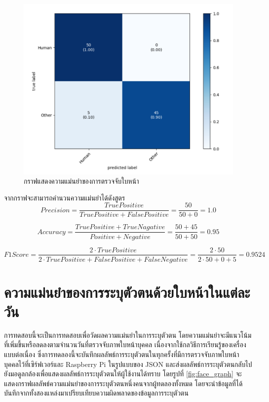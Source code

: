 \begin{figure}[!ht]
  \begin{center}
    \includegraphics[scale=.45]{pic/face_result.png}
    \caption[กราฟแสดงความแม่นยำของการตรวจจับใบหน้า]{กราฟแสดงความแม่นยำของการตรวจจับใบหน้า}
    \label{fig:acc_graph}
  \end{center}
\end{figure}
\newpage
\indent จากกราฟจะสามารถคำนวนความแม่นยำได้ดังสูตร 
\begin{equation}\label{eq:Precision}
Precision=\frac{True Positive}{True Positive + False Positive}=\frac{50}{50+0} = 1.0
\end{equation}

\begin{equation}\label{eq:Accuracy}
Accuracy=\frac{True Positive + True Nagative}{Positive + Negative}=\frac{50+45}{50+50} = 0.95
\end{equation}

\begin{equation}\label{eq:F1Score}
F1 Score=\frac{2\cdot True Positive}{2\cdot True Positive + False Positive + False Negative}=\frac{2\cdot 50}{2\cdot 50+0+5} = 0.9524
\end{equation}

\section{ความแม่นยำของการระบุตัวตนด้วยใบหน้าในแต่ละวัน}
การทดสอบนี้จะเป็นการทดสอบเพื่อวัดผลความแม่นยำในการระบุตัวตน โดยความแม่นยำจะมีแนวโน้มที่เพิ่มขึ้นหรือลดลงตามจำนวนวันที่ตรวจจับภาพใบหน้าบุคคล
เนื่องจากใช้กลวิธีการเรียนรู้ของเครื่องแบบต่อเนื่อง ซึ่งการทดลองนี้จะบันทึกผลลัพธ์การระบุตัวตนในทุกครั้งที่มีการตรวจจับภาพใบหน้าบุคคลไว้ที่เซิร์ฟเวอร์และ Raspberry Pi 
ในรูปแบบของ JSON และส่งผลลัพธ์การระบุตัวตนกลับไปยังมอดูลกล้องเพื่อแสดงผลลัพธ์การระบุตัวตนให้ผู้ใช้งานได้ทราบ 
โดยรูปที่ \ref*{fig:face_graph} จะแสดงกราฟผลลัพธ์ความแม่นยำของการระบุตัวตนหนึ่งคนจากผู้ทดลองทั้งหมด 
โดยจะนำข้อมูลที่ได้บันทึกจากทั้งสองแหล่งมาเปรียบเทียบความผิดพลาดของข้อมูลการระบุตัวตน

